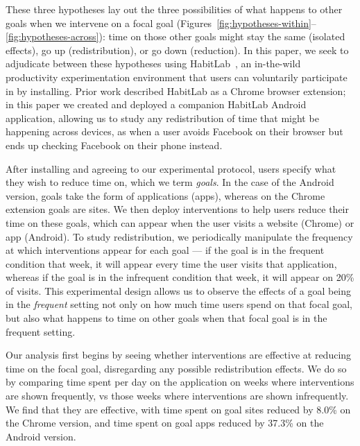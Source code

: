 These three hypotheses lay out the three possibilities of what happens to other goals when we intervene on a focal goal (Figures~\ref{fig:hypotheses-within}--\ref{fig:hypotheses-across}): time on those other goals might stay the same (isolated effects), go up (redistribution), or go down (reduction). In this paper, we seek to adjudicate between these hypotheses using  HabitLab~\cite{habitlab}, an in-the-wild productivity experimentation environment that users can voluntarily participate in by installing. Prior work described HabitLab as a Chrome browser extension; in this paper we created and deployed a companion HabitLab Android application, allowing us to study any redistribution of time that might be happening across devices, as when a user avoids Facebook on their browser but ends up checking Facebook on their phone instead.

After installing and agreeing to our experimental protocol, users specify what they wish to reduce time on, which we term \emph{goals}. In the case of the Android version, goals take the form of applications (apps), whereas on the Chrome extension goals are sites.
We then deploy interventions to help users reduce their time on these goals, which can appear when the user visits a website (Chrome) or app (Android). To study redistribution, we periodically manipulate  the frequency at which interventions appear for each goal --- if the goal is in the frequent condition that week, it will appear every time the user visits that application, whereas if the goal is in the infrequent condition that week, it will appear on 20\% of visits. This experimental design allows us to observe the effects of a goal being in the \textit{frequent} setting not only on how much time users spend on that focal goal, but also what happens to time on other goals when that focal goal is in the frequent setting.


Our analysis first begins by seeing whether interventions are effective at reducing time on the focal goal, disregarding any possible redistribution effects. We do so by comparing time spent per day on the application on weeks where interventions are shown frequently, vs those weeks where interventions are shown infrequently. We find that they are effective, with time spent on goal sites reduced by 8.0\% on the Chrome version, and time spent on goal apps reduced by 37.3\% on the Android version.

